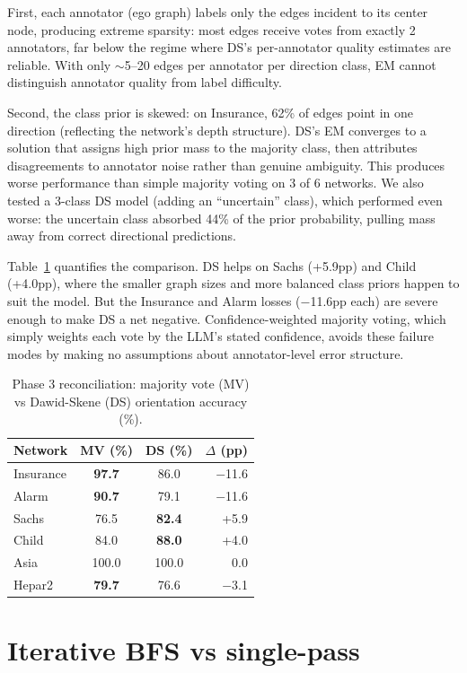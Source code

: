 \documentclass{article}
\begin{document}
First, each annotator (ego graph) labels only the edges incident to its center node, producing extreme sparsity: most edges receive votes from exactly 2 annotators, far below the regime where DS's per-annotator quality estimates are reliable. With only $\sim$5--20 edges per annotator per direction class, EM cannot distinguish annotator quality from label difficulty.

Second, the class prior is skewed: on Insurance, 62\% of edges point in one direction (reflecting the network's depth structure). DS's EM converges to a solution that assigns high prior mass to the majority class, then attributes disagreements to annotator noise rather than genuine ambiguity. This produces worse performance than simple majority voting on 3 of 6 networks. We also tested a 3-class DS model (adding an ``uncertain'' class), which performed even worse: the uncertain class absorbed 44\% of the prior probability, pulling mass away from correct directional predictions.

Table~\ref{tab:ds} quantifies the comparison. DS helps on Sachs (+5.9pp) and Child (+4.0pp), where the smaller graph sizes and more balanced class priors happen to suit the model. But the Insurance and Alarm losses ($-$11.6pp each) are severe enough to make DS a net negative. Confidence-weighted majority voting, which simply weights each vote by the LLM's stated confidence, avoids these failure modes by making no assumptions about annotator-level error structure.

\begin{table}[h]
\centering
\caption{Phase 3 reconciliation: majority vote (MV) vs Dawid-Skene (DS) orientation accuracy (\%).}
\small
\begin{tabular}{lccr}
\toprule
Network & MV (\%) & DS (\%) & $\Delta$ (pp) \\
\midrule
Insurance & \textbf{97.7} & 86.0 & $-$11.6 \\
Alarm     & \textbf{90.7} & 79.1 & $-$11.6 \\
Sachs     & 76.5 & \textbf{82.4} & +5.9 \\
Child     & 84.0 & \textbf{88.0} & +4.0 \\
Asia      & 100.0 & 100.0 & 0.0 \\
Hepar2    & \textbf{79.7} & 76.6 & $-$3.1 \\
\bottomrule
\end{tabular}
\label{tab:ds}
\end{table}


\section{Iterative BFS vs single-pass}
\label{app:bfs}
\end{document}
